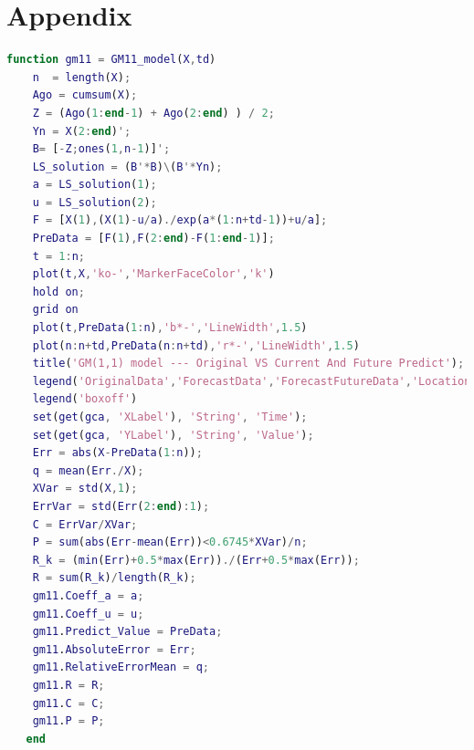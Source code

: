 \documentclass{apmcmthesis}
\begin{document}
\section{Appendix}
\begin{lstlisting}[language=matlab,caption={The matlab Source code of Algorithm}]
    function gm11 = GM11_model(X,td)
    n  = length(X);    
    Ago = cumsum(X);   
    Z = (Ago(1:end-1) + Ago(2:end) ) / 2; 
    Yn = X(2:end)';
    B= [-Z;ones(1,n-1)]'; 
    LS_solution = (B'*B)\(B'*Yn); 
    a = LS_solution(1);   
    u = LS_solution(2); 
    F = [X(1),(X(1)-u/a)./exp(a*(1:n+td-1))+u/a];
    PreData = [F(1),F(2:end)-F(1:end-1)];
    t = 1:n;
    plot(t,X,'ko-','MarkerFaceColor','k')  
    hold on;
    grid on
    plot(t,PreData(1:n),'b*-','LineWidth',1.5)  
    plot(n:n+td,PreData(n:n+td),'r*-','LineWidth',1.5)
    title('GM(1,1) model --- Original VS Current And Future Predict');
    legend('OriginalData','ForecastData','ForecastFutureData','Location','best')
    legend('boxoff')
    set(get(gca, 'XLabel'), 'String', 'Time');
    set(get(gca, 'YLabel'), 'String', 'Value');
    Err = abs(X-PreData(1:n));  
    q = mean(Err./X);
    XVar = std(X,1);
    ErrVar = std(Err(2:end):1);
    C = ErrVar/XVar; 
    P = sum(abs(Err-mean(Err))<0.6745*XVar)/n;  
    R_k = (min(Err)+0.5*max(Err))./(Err+0.5*max(Err));
    R = sum(R_k)/length(R_k); 
    gm11.Coeff_a = a;
    gm11.Coeff_u = u;
    gm11.Predict_Value = PreData;
    gm11.AbsoluteError = Err;
    gm11.RelativeErrorMean = q;
    gm11.R = R;
    gm11.C = C;
    gm11.P = P;
   end
   
\end{lstlisting}
\end{document}
